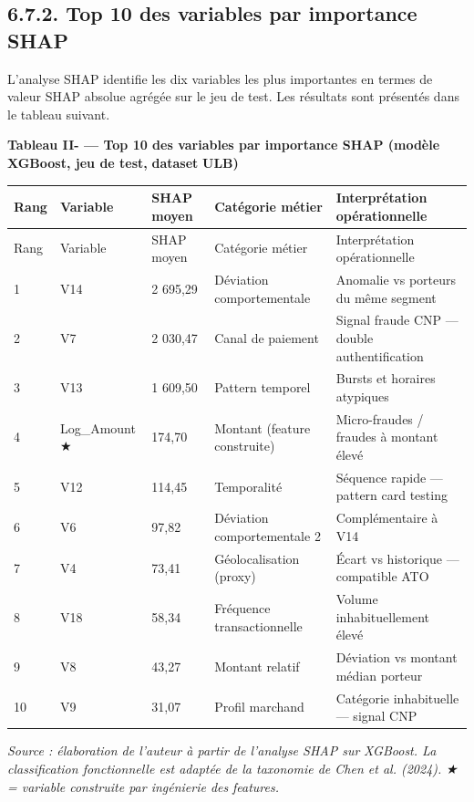 \subsection{6.7.2. Top 10 des variables par importance SHAP}

L'analyse SHAP identifie les dix variables les plus importantes en termes de valeur SHAP absolue agrégée sur le jeu de test. Les résultats sont présentés dans le tableau suivant.

\textbf{Tableau II- — Top 10 des variables par importance SHAP (modèle }\textbf{XGBoost}\textbf{, jeu de test, }\textbf{dataset}\textbf{ ULB)}

\begin{longtable}{|p{}|p{}|p{}|p{}|p{}|}
\hline
Rang & Variable & SHAP moyen & Catégorie métier & Interprétation opérationnelle \\
\hline
\endfirsthead
\hline
Rang & Variable & SHAP moyen & Catégorie métier & Interprétation opérationnelle \\
\hline
\endhead
1 & V14 & 2 695,29 & Déviation comportementale & Anomalie vs porteurs du même segment \\
\hline
2 & V7 & 2 030,47 & Canal de paiement & Signal fraude CNP — double authentification \\
\hline
3 & V13 & 1 609,50 & Pattern temporel & Bursts et horaires atypiques \\
\hline
4 & Log\_Amount ★ & 174,70 & Montant (feature construite) & Micro-fraudes / fraudes à montant élevé \\
\hline
5 & V12 & 114,45 & Temporalité & Séquence rapide — pattern card testing \\
\hline
6 & V6 & 97,82 & Déviation comportementale 2 & Complémentaire à V14 \\
\hline
7 & V4 & 73,41 & Géolocalisation (proxy) & Écart vs historique — compatible ATO \\
\hline
8 & V18 & 58,34 & Fréquence transactionnelle & Volume inhabituellement élevé \\
\hline
9 & V8 & 43,27 & Montant relatif & Déviation vs montant médian porteur \\
\hline
10 & V9 & 31,07 & Profil marchand & Catégorie inhabituelle — signal CNP \\
\hline
\end{longtable}

\emph{Source : élaboration de l'auteur à partir de l'analyse SHAP sur }\emph{XGBoost}\emph{. La classification fonctionnelle est adaptée de la taxonomie de Chen et al. (2024). }\emph{★}\emph{ = variable construite par ingénierie des }\emph{features}\emph{.}

